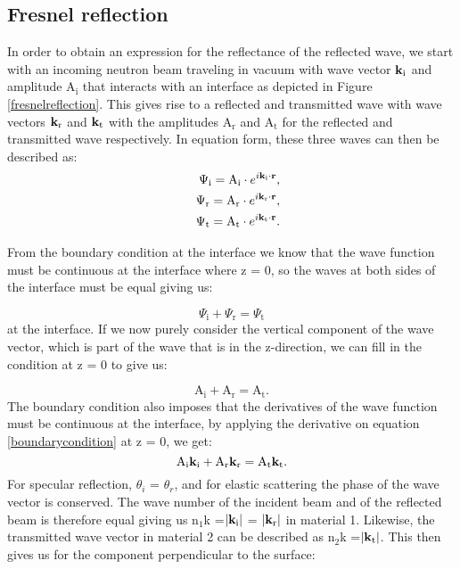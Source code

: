 \subsection{Fresnel reflection}\label{fresneltheory}
In order to obtain an expression for the reflectance of the reflected wave, we start with an incoming neutron beam traveling in vacuum with wave vector $\vb{k}_\textrm{i}$ and amplitude A$_\textrm{i}$ that interacts with an interface as depicted in Figure \ref{fresnelreflection}. This gives rise to a reflected and transmitted wave with wave vectors $\vb{k}_\textrm{r}$ and $\vb{k}_\textrm{t}$ with the amplitudes A$_\textrm{r}$ and A$_\textrm{t}$ for the reflected and transmitted wave respectively. In equation form, these three waves can then be described as:
\begin{eqnarray}\label{waves_equation}
	&&\Psi_{\textrm{i}} = \textrm{A}_{\textrm{i}} \cdot e^{i\vb{k}_\textrm{i} \cdot \vb{r}}, \\
	&&\Psi_{\textrm{r}} = \textrm{A}_{\textrm{r}} \cdot e^{i \vb{k}_\textrm{r}\cdot \vb{r}}, \\	
	&&\Psi_{\textrm{t}}= \textrm{A}_{\textrm{t}}  \cdot e^{i \vb{k}_\textrm{t}\cdot \vb{r}}.
\end{eqnarray}

From the boundary condition at the interface we know that the wave function must be continuous at the interface where z = 0, so the waves at both sides of the interface must be equal giving us:

\begin{equation}\label{boundarycondition}
	\Psi_{\textrm{i}} + \Psi_{\textrm{r}} = \Psi_{\textrm{t}}
\end{equation} at the interface. If we now purely consider the vertical component of the wave vector, which is part of the wave that is in the z-direction, we can fill in the condition at z = 0 to give us:

\begin{equation}\label{firstboundary}
	\textrm{A}_{\textrm{i}} + \textrm{A}_{\textrm{r}} = \textrm{A}_{\textrm{t}}.
\end{equation}	
The boundary condition also imposes that the derivatives of the wave function must be continuous at the interface, by applying the derivative on equation \ref{boundarycondition} at z = 0, we get:
\begin{equation}
	\textrm{A}_{\textrm{i}}\vb{k}_\textrm{i} + \textrm{A}_{\textrm{r}}\vb{k}_\textrm{r} = \textrm{A}_{\textrm{t}}\vb{k}_\textrm{t}.
\end{equation}
For specular reflection, $\theta_i$ = $\theta_r$, and for elastic scattering the phase of the wave vector is conserved. The wave number of the incident beam and of the reflected beam is therefore equal giving us  n$_1$k =$\abs{\vb{k}_\textrm{i}}$ = $\abs{\vb{k}_\textrm{r}}$ in material 1. Likewise, the transmitted wave vector in material 2 can be described as n$_2$k =$\abs{\vb{k}_\textrm{t}}$. This then gives us for the component perpendicular to the surface:

